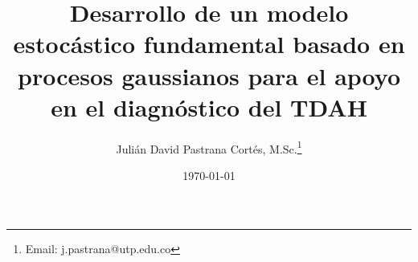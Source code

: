 \usepackage[es-tabla]{babel}




\usepackage[capitalise, noabbrev]{cleveref}



\title{Desarrollo de un modelo estocástico fundamental basado en procesos gaussianos para el apoyo en el diagnóstico del TDAH}
\author{
	Julián David Pastrana Cortés, M.Sc.\thanks{Email: j.pastrana@utp.edu.co}
}


\date{\today}